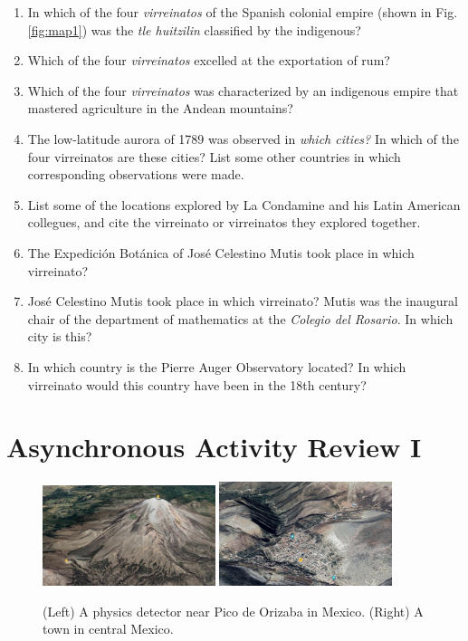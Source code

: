 \documentclass[10pt]{article}
\begin{document}
\begin{enumerate}
\item In which of the four \textit{virreinatos} of the Spanish colonial empire (shown in Fig. \ref{fig:map1}) was the \textit{tle huitzilin} classified by the indigenous?
\item Which of the four \textit{virreinatos} excelled at the exportation of rum?
\item Which of the four \textit{virreinatos} was characterized by an indigenous empire that mastered agriculture in the Andean mountains?
\item The low-latitude aurora of 1789 was observed in \textit{which cities?}  In which of the four virreinatos are these cities?  List some other countries in which corresponding observations were made.
\item List some of the locations explored by La Condamine and his Latin American collegues, and cite the virreinato or virreinatos they explored together.
\item The Expedici\'{o}n Bot\'{a}nica of Jos\'{e} Celestino Mutis took place in which virreinato?
\item Jos\'{e} Celestino Mutis took place in which virreinato?  Mutis was the inaugural chair of the department of mathematics at the \textit{Colegio del Rosario}.  In which city is this?
\item In which country is the Pierre Auger Observatory located?  In which virreinato would this country have been in the 18th century?
\end{enumerate}

\clearpage

\section{Asynchronous Activity Review I}

\begin{figure}
\centering
\includegraphics[width=0.45\textwidth]{figures/hawc.png}
\includegraphics[width=0.45\textwidth]{figures/real.png}
\caption{\label{fig:mines} (Left) A physics detector near Pico de Orizaba in Mexico. (Right) A town in central Mexico.}
\end{figure}
\end{document}
